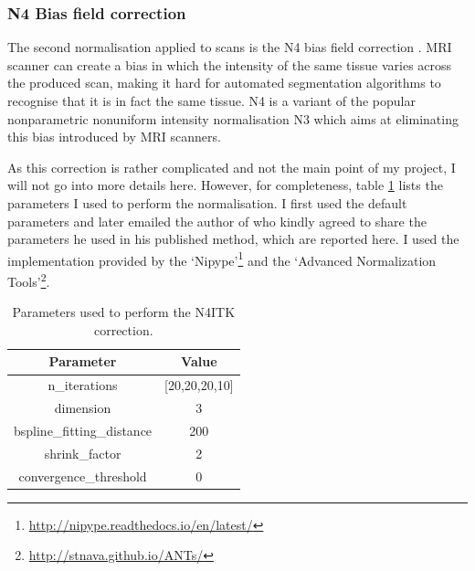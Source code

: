 \documentclass[12pt,a4paper,twoside,openright]{report}
\begin{document}
\subsubsection{N4 Bias field correction}
The second normalisation applied to scans is the N4 bias field correction \cite{n4itk}. MRI scanner can create a bias in which the intensity of the same tissue varies across the produced scan, making it hard for automated segmentation algorithms to recognise that it is in fact the same tissue. N4 is a variant of the popular nonparametric nonuniform intensity normalisation N3 which aims at eliminating this bias introduced by MRI scanners. 

As this correction is rather complicated and not the main point of my project, I will not go into more details here. However, for completeness, table \ref{table:n4_params} lists the parameters I used to perform the normalisation. I first used the default parameters and later emailed the author of \cite{pereira} who kindly agreed to share the parameters he used in his published method, which are reported here. I used the implementation provided by the `Nipype'\footnote{\url{http://nipype.readthedocs.io/en/latest/}} and the `Advanced Normalization Tools'\footnote{\url{http://stnava.github.io/ANTs/}}.

\begin{table}[h]
\centering	
\begin{tabular}{ c c } 
\textbf{Parameter} & \textbf{Value} \\
 \hline
 n\_iterations & [20,20,20,10] \\ 
 dimension & 3 \\
 bspline\_fitting\_distance & 200 \\
 shrink\_factor & 2\\
 convergence\_threshold & 0
\end{tabular}
\caption{Parameters used to perform the N4ITK correction.}
\label{table:n4_params}
\end{table}
\end{document}
